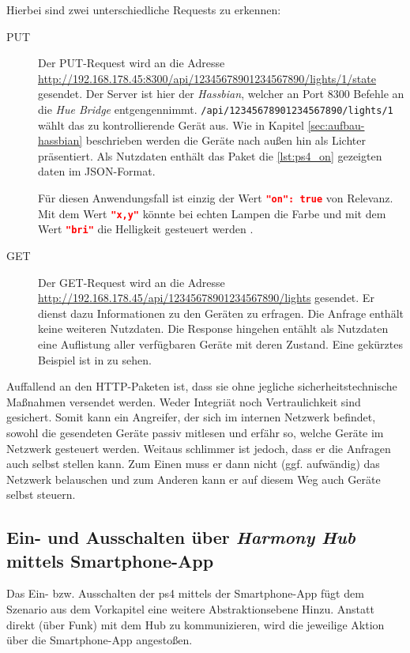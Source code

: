 
Hierbei sind zwei unterschiedliche Requests zu erkennen:
\begin{description}
    \item[PUT]
        Der PUT-Request wird an die Adresse \url{http://192.168.178.45:8300/api/12345678901234567890/lights/1/state} gesendet.
        Der Server ist hier der \textit{Hassbian}, welcher an Port 8300 Befehle an die \textit{Hue Bridge} entgengennimmt.
        \texttt{/api/12345678901234567890/lights/1} wählt das zu kontrollierende Gerät aus.
        Wie in Kapitel \ref{sec:aufbau-hassbian} \textit{} beschrieben werden die Geräte nach außen hin als Lichter präsentiert.
        Als Nutzdaten enthält das Paket die \autoref{lst:ps4_on} gezeigten daten im JSON-Format.
        
        Für diesen Anwendungsfall ist einzig der Wert \lstinline[language=json]{"on": true} von Relevanz.
        Mit dem Wert \lstinline[language=json]{"x,y"} könnte bei echten Lampen die Farbe
        und mit dem Wert \lstinline[language=json]{"bri"} die Helligkeit gesteuert werden \cite{Coreconc26:online}.
    \item[GET]
        Der GET-Request wird an die Adresse \url{http://192.168.178.45/api/12345678901234567890/lights} gesendet.
        Er dienst dazu Informationen zu den Geräten zu erfragen.
        Die Anfrage enthält keine weiteren Nutzdaten.
        Die Response hingehen entählt als Nutzdaten eine Auflistung aller verfügbaren Geräte mit deren Zustand.
        Eine gekürztes Beispiel ist in zu sehen.

\end{description}

Auffallend an den HTTP-Paketen ist,
dass sie ohne jegliche sicherheitstechnische Maßnahmen versendet werden.
Weder Integriät noch Vertraulichkeit sind gesichert.
Somit kann ein Angreifer, der sich im internen Netzwerk befindet,
sowohl die gesendeten Geräte passiv mitlesen und erfähr so,
welche Geräte im Netzwerk gesteuert werden.
Weitaus schlimmer ist jedoch, dass er die Anfragen auch selbst stellen kann.
Zum Einen muss er dann nicht (ggf. aufwändig) das Netzwerk belauschen
und zum Anderen kann er auf diesem Weg auch Geräte selbst steuern.


\subsection{Ein- und Ausschalten über \textit{Harmony Hub} mittels Smartphone-App}
Das Ein- bzw. Ausschalten der \ac{ps4} mittels der Smartphone-App fügt dem Szenario aus dem Vorkapitel eine weitere Abstraktionsebene Hinzu.
Anstatt direkt (über Funk) mit dem Hub zu kommunizieren,
wird die jeweilige Aktion über die Smartphone-App angestoßen.

